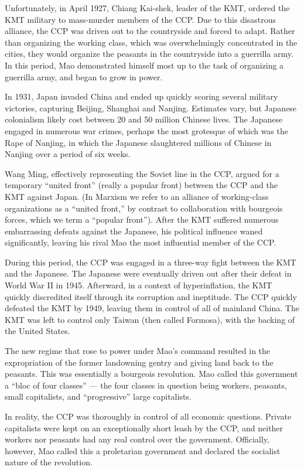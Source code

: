 Unfortunately, in April 1927, Chiang Kai-shek, leader of the KMT, ordered the KMT military to mass-murder members of the CCP. Due to this disastrous alliance, the CCP was driven out to the countryside and forced to adapt. Rather than organizing the working class, which was overwhelmingly concentrated in the cities, they would organize the peasants in the countryside into a guerrilla army. In this period, Mao demonstrated himself most up to the task of organizing a guerrilla army, and began to grow in power.

In 1931, Japan invaded China and ended up quickly scoring several military victories, capturing Beijing, Shanghai and Nanjing. Estimates vary, but Japanese colonialism likely cost between 20 and 50 million Chinese lives. The Japanese engaged in numerous war crimes, perhaps the most grotesque of which was the Rape of Nanjing, in which the Japanese slaughtered millions of Chinese in Nanjing over a period of six weeks.

Wang Ming, effectively representing the Soviet line in the CCP, argued for a temporary ``united front'' (really a popular front) between the CCP and the KMT against Japan. (In Marxism we refer to an alliance of working-class organizations as a ``united front,'' by contrast to collaboration with bourgeois forces, which we term a ``popular front''). After the KMT suffered numerous embarrassing defeats against the Japanese, his political influence waned significantly, leaving his rival Mao the most influential member of the CCP.

During this period, the CCP was engaged in a three-way fight between the KMT and the Japanese. The Japanese were eventually driven out after their defeat in World War II in 1945. Afterward, in a context of hyperinflation, the KMT quickly discredited itself through its corruption and ineptitude. The CCP quickly defeated the KMT by 1949, leaving them in control of all of mainland China. The KMT was left to control only Taiwan (then called Formosa), with the backing of the United States.

The new regime that rose to power under Mao's command resulted in the expropriation of the former landowning gentry and giving land back to the peasants. This was essentially a bourgeois revolution. Mao called this government a ``bloc of four classes'' --- the four classes in question being workers, peasants, small capitalists, and ``progressive'' large capitalists.

In reality, the CCP was thoroughly in control of all economic questions. Private capitalists were kept on an exceptionally short leash by the CCP, and neither workers nor peasants had any real control over the government. Officially, however, Mao called this a proletarian government and declared the socialist nature of the revolution.


